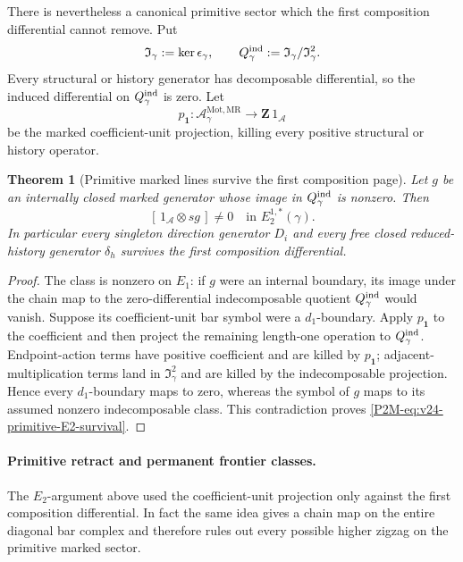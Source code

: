 \documentclass[11pt]{article}
\newtheorem{theorem}{Theorem}[section]
\theoremstyle{remark}
\newcommand{\Z}{\mathbf Z}
\newcommand{\Mot}{\mathrm{Mot}}
\newcommand{\MR}{\mathrm{MR}}
\begin{document}
There is nevertheless a canonical primitive sector which the first
composition differential cannot remove.  Put
\[
 \mathfrak I_\gamma:=\ker\epsilon_\gamma,\qquad
 Q_\gamma^{\rm ind}:=
 \mathfrak I_\gamma/\mathfrak I_\gamma^2.
\]
Every structural or history generator has decomposable differential, so the
induced differential on \(Q_\gamma^{\rm ind}\) is zero.  Let
\[
 p_{\mathbf1}:
 \mathscr A_\gamma^{\Mot,\MR}\longrightarrow
 \Z\,1_{\mathscr A}
\]
be the marked coefficient-unit projection, killing every positive structural
or history operator.

\begin{theorem}[Primitive marked lines survive the first composition page]
\label{P2M-thm:v24-primitive-survival}
Let \(g\) be an internally closed marked generator whose image in
\(Q_\gamma^{\rm ind}\) is nonzero.  Then
\begin{equation}\label{P2M-eq:v24-primitive-E2-survival}
 \boxed{
 [\,1_{\mathscr A}\otimes sg\,]
 \ne0
 \quad\text{in }E_2^{1,*}(\gamma).}
\end{equation}
In particular every singleton direction generator \(D_i\) and every free
closed reduced-history generator \(\delta_h\) survives the first composition
differential.
\end{theorem}

\begin{proof}
The class is nonzero on \(E_1\): if \(g\) were an internal boundary, its image
under the chain map to the zero-differential indecomposable quotient
\(Q_\gamma^{\rm ind}\) would vanish.  Suppose its coefficient-unit bar symbol
were a \(d_1\)-boundary.  Apply \(p_{\mathbf1}\) to the coefficient and then
project the remaining length-one operation to \(Q_\gamma^{\rm ind}\).
Endpoint-action terms have positive coefficient and are killed by
\(p_{\mathbf1}\); adjacent-multiplication terms land in
\(\mathfrak I_\gamma^2\) and are killed by the indecomposable projection.
Hence every \(d_1\)-boundary maps to zero, whereas the symbol of \(g\) maps to
its assumed nonzero indecomposable class.  This contradiction proves
\eqref{P2M-eq:v24-primitive-E2-survival}.
\end{proof}


\paragraph{Primitive retract and permanent frontier classes.}


The \(E_2\)-argument above used the coefficient-unit projection only against
the first composition differential.  In fact the same idea gives a chain map
on the entire diagonal bar complex and therefore rules out every possible
higher zigzag on the primitive marked sector.
\end{document}
